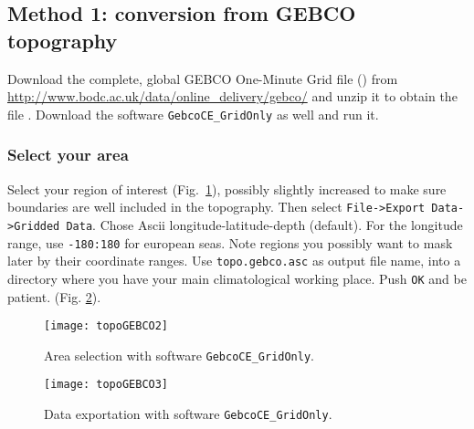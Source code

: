 \subsection{Method 1: conversion from GEBCO topography\label{sec:topogebco}}

Download the complete, global GEBCO One-Minute Grid file () from \url{http://www.bodc.ac.uk/data/online_delivery/gebco/} and unzip it to obtain the file . Download the software \texttt{GebcoCE\_GridOnly} as well and run it. 

\subsubsection{Select your area}

Select your region of interest (Fig.~\ref{fig:gebco1}), possibly slightly increased to make sure boundaries are well included in the topography. Then select {\tt File->Export Data->Gridded Data}. Chose Ascii longitude-latitude-depth (default). For the longitude range, use {\tt -180:180} for european seas. Note regions you possibly want to mask later by their coordinate ranges.  Use {\tt topo.gebco.asc} as output file name, into a directory where
you have your main climatological working place. Push {\tt OK} and be patient. (Fig. \ref{fig:gebco2}). 

\begin{figure}[htpb]
\centering
\texttt{[image: topoGEBCO2]}
\caption{Area selection with software \texttt{GebcoCE\_GridOnly}.\label{fig:gebco1}}
\end{figure}


\begin{figure}[htpb]
\centering
\texttt{[image: topoGEBCO3]}
\caption{Data exportation with software \texttt{GebcoCE\_GridOnly}.\label{fig:gebco2}}
\end{figure}



%


